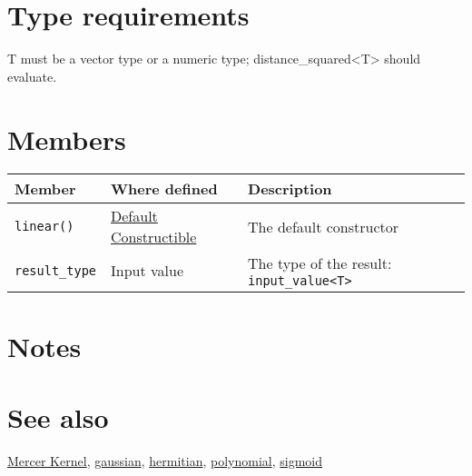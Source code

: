 \documentclass{article}
\begin{document}
\section*{Type requirements}

T must be a vector type or a numeric type; distance_squared<T> should evaluate.


\section*{Members}

\begin{tabular}{lll}
\textbf{Member} & \textbf{Where defined} & \textbf{Description} \\
\hline
\texttt{linear()} & \href{http://www.sgi.com/tech/stl/DefaultConstructible.html}{Default Constructible} & The default constructor \\
\texttt{result_type} & Input value & The type of the result: \texttt{input_value<T>} \\
\end{tabular}

\section*{Notes}

\section*{See also}

\href{\kmlroot/mercer_kernel.html}{Mercer Kernel},
\href{\kmlroot/gaussian.html}{gaussian},
\href{\kmlroot/hermitian.html}{hermitian},
\href{\kmlroot/polynomial.html}{polynomial},
\href{\kmlroot/sigmoid.html}{sigmoid}



\end{document}
